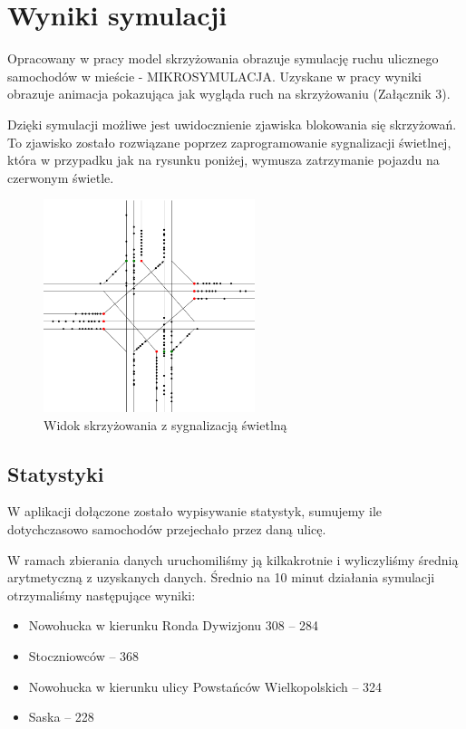 \documentclass{sprawozdanie-agh}
\begin{document}
	\section{Wyniki symulacji}

	Opracowany w pracy model skrzyżowania obrazuje symulację ruchu ulicznego samochodów w mieście - MIKROSYMULACJA. Uzyskane w pracy wyniki obrazuje animacja pokazująca jak wygląda ruch na skrzyżowaniu (Załącznik 3).

	Dzięki symulacji możliwe jest uwidocznienie zjawiska blokowania się skrzyżowań. To zjawisko zostało rozwiązane poprzez zaprogramowanie sygnalizacji świetlnej, która w przypadku jak na rysunku poniżej, wymusza zatrzymanie pojazdu na czerwonym świetle.

	\begin{figure}[H]
		\centering
		\captionsetup{justification=centering}
		\includegraphics[width=0.55\textwidth]{symulacja}
		\caption{Widok skrzyżowania z sygnalizacją świetlną}
		\label{fig:Wyniki_sym_1}
	\end{figure}

	\subsection{Statystyki}
	
	W aplikacji dołączone zostało wypisywanie statystyk, sumujemy ile dotychczasowo samochodów przejechało przez daną ulicę.
	
	W ramach zbierania danych uruchomiliśmy ją kilkakrotnie i wyliczyliśmy średnią arytmetyczną z uzyskanych danych.
	Średnio na 10 minut działania symulacji otrzymaliśmy następujące wyniki:
	\begin{itemize}
		\item Nowohucka w kierunku Ronda Dywizjonu 308 -- 284
		\item Stoczniowców -- 368
		\item Nowohucka w kierunku ulicy Powstańców Wielkopolskich -- 324
		\item Saska -- 228
	\end{itemize}
	
\end{document}
